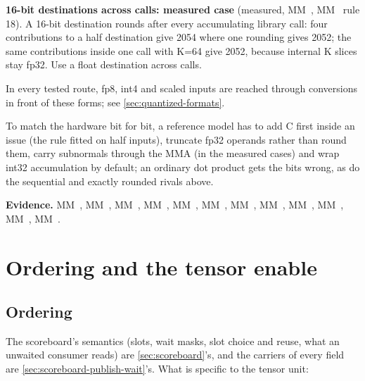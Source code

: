 \textbf{16-bit destinations across calls: measured case} (measured, MM~, MM~ rule 18). A 16-bit destination rounds
after every accumulating library call: four contributions to a half destination give 2054 where one rounding gives
2052; the same contributions inside one call with K=64 give 2052, because internal K slices stay fp32. Use a float
destination across calls.

In every tested route, fp8, int4 and scaled inputs are reached through conversions in front of these forms; see \cref{sec:quantized-formats}.

To match the hardware bit for bit, a reference model has to add C first inside an issue (the rule fitted on half
inputs), truncate fp32 operands rather than round them, carry subnormals through the MMA (in the measured cases) and
wrap int32 accumulation by default; an ordinary dot product gets the bits wrong, as do the sequential and exactly
rounded rivals above.

\textbf{Evidence.} MM~, MM~, MM~, MM~, MM~, MM~, MM~, MM~, MM~, MM~, MM~, MM~.

\section{Ordering and the tensor enable}\label{sec:ordering-enable}

\subsection*{Ordering}

The scoreboard's semantics (slots, wait masks, slot choice and reuse, what an unwaited consumer reads) are
\cref{sec:scoreboard}'s, and the carriers of every field are \cref{sec:scoreboard-publish-wait}'s. What is specific to the tensor unit:

